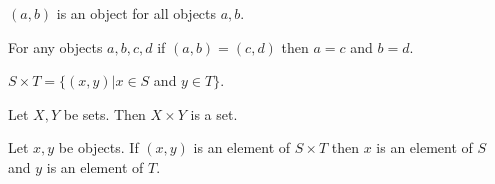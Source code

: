 \documentclass[11pt]{article}
\begin{document}
\begin{forthel}

\begin{axiom}
$(a,b)$ is an object for all objects $a,b$.
\end{axiom}

\begin{axiom}
For any objects $a,b,c,d$ if $(a,b) = (c,d)$ then $a = c$
and $b = d$.
\end{axiom}

\begin{definition}
$S \times T = \{(x,y) | x \in S$ and $y \in T\}$.
\end{definition}

\begin{axiom} Let $X,Y$ be sets. Then
$X \times Y$ is a set.
\end{axiom}

\begin{lemma}
Let $x,y$ be objects.
If $(x,y)$ is an element of $S \times T$ then $x$ is an
element of $S$ and $y$ is an element of $T$.
\end{lemma}

\end{forthel}
\end{document}
